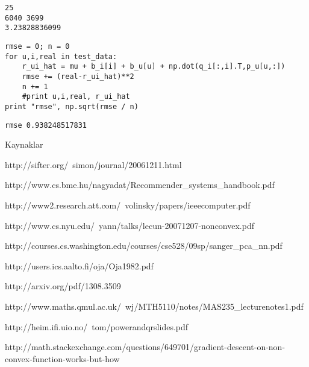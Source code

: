 \documentclass[12pt,fleqn]{article}\usepackage{../common}
\begin{document}
\begin{verbatim}
25
6040 3699
3.23828836099
\end{verbatim}


\begin{verbatim}
rmse = 0; n = 0
for u,i,real in test_data:
    r_ui_hat = mu + b_i[i] + b_u[u] + np.dot(q_i[:,i].T,p_u[u,:])
    rmse += (real-r_ui_hat)**2
    n += 1
    #print u,i,real, r_ui_hat
print "rmse", np.sqrt(rmse / n)
\end{verbatim}

\begin{verbatim}
rmse 0.938248517831
\end{verbatim}










Kaynaklar

http://sifter.org/~simon/journal/20061211.html

http://www.cs.bme.hu/nagyadat/Recommender_systems_handbook.pdf

http://www2.research.att.com/~volinsky/papers/ieeecomputer.pdf

http://www.cs.nyu.edu/~yann/talks/lecun-20071207-nonconvex.pdf

http://courses.cs.washington.edu/courses/cse528/09sp/sanger_pca_nn.pdf

http://users.ics.aalto.fi/oja/Oja1982.pdf

http://arxiv.org/pdf/1308.3509

http://www.maths.qmul.ac.uk/~wj/MTH5110/notes/MAS235_lecturenotes1.pdf

http://heim.ifi.uio.no/~tom/powerandqrslides.pdf

http://math.stackexchange.com/questions/649701/gradient-descent-on-non-convex-function-works-but-how
\end{document}
